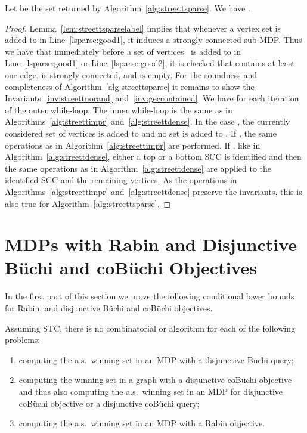 \documentclass[11pt,letterpaper]{article}
\begin{document}
\begin{proposition}
	Let  be the set returned by Algorithm~\ref{alg:streettsparse}.
	We have .
\end{proposition}

\begin{proof}
	Lemma~\ref{lem:streettsparselabel} implies that whenever a vertex set is added 
	to  in Line~\ref{lsparse:good1}, it induces a strongly connected sub-MDP.
	Thus we have that immediately before a set of vertices~ is added to 
	 in Line~\ref{lsparse:good1} or Line~\ref{lsparse:good2}, it is checked that 
	 contains at least one edge, is strongly connected, and 
	is empty. For the soundness and completeness of Algorithm~\ref{alg:streettsparse} 
	it remains to show the Invariants~\ref{inv:streettnorand} and~\ref{inv:geccontained}.
	We have for each iteration of the outer while-loop: 
	The inner while-loop is the same as in Algorithms~\ref{alg:streettimpr} 
	and~\ref{alg:streettdense}. In the case ,
	the currently considered set of vertices is added to  and
	no set is added to . If ,
	the same operations as in Algorithm~\ref{alg:streettimpr} are performed.
	If , 
	like in Algorithm~\ref{alg:streettdense},
	either a top or a bottom SCC is identified and then the same operations as in 
	Algorithm~\ref{alg:streettdense} are applied to the identified SCC and the 
	remaining vertices. As the operations in 
	Algorithms~\ref{alg:streettimpr} and~\ref{alg:streettdense} preserve 
	the invariants, this is also true for Algorithm~\ref{alg:streettsparse}.	
\end{proof}


\section{MDPs with Rabin and Disjunctive Büchi and coBüchi Objectives}\label{sec:rabin}

In the first part of this section we prove the following conditional lower bounds for Rabin, 
and disjunctive Büchi and coBüchi objectives.

\begin{theorem}
  Assuming STC, there is no combinatorial  or  algorithm for 
  each of the following problems:
  \begin{enumerate}
   \item computing the a.s.~winning set in an MDP with a disjunctive Büchi query;
   \item computing the winning set in a graph with a disjunctive coBüchi objective and
	 thus also computing the a.s.~winning set in an MDP for disjunctive coBüchi objective or 
						 a disjunctive coBüchi query;
   \item computing the a.s.~winning set in an MDP with a Rabin objective.
  \end{enumerate}
\end{theorem}
\end{document}
